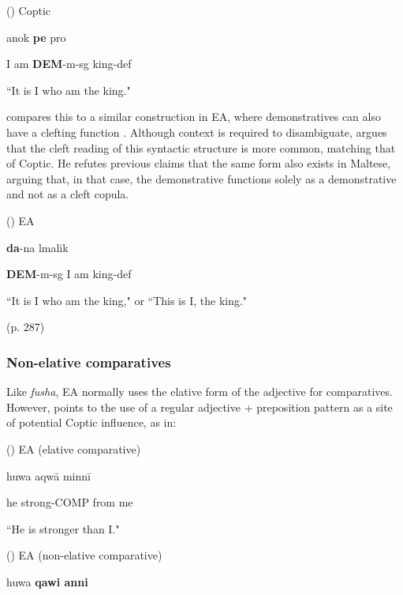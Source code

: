 \documentclass[12pt,a4paper]{article}
\newcounter{example}
\begin{document}
\vspace{3mm}
(\theexample) Coptic

anok \textbf{pe} p\textschwa ro

I am \textbf{DEM}-m-sg king-def

``It is I who am the king."
\begin{flushright}
\parencite[287]{bishai_coptic_1962}
\end{flushright}

\textcite{bishai_coptic_1962} compares this to a similar construction in EA, where demonstratives can also have a clefting function \parencite{gad_syntactic_2011}. Although context is required to disambiguate, \textcite{bishai_coptic_1962} argues that the cleft reading of this syntactic structure is more common, matching that of Coptic. He refutes previous claims that the same form also exists in Maltese, arguing that, in that case, the demonstrative functions solely as a demonstrative and not as a cleft copula.

\vspace{3mm}
(\theexample) EA

\textbf{da}-na lmalik

\textbf{DEM}-m-sg I am king-def

``It is I who am the king," or ``This is I, the king."
\begin{flushright}
(p. 287)
\end{flushright}

\subsubsection{Non-elative comparatives}

Like \textit{fusha}, EA normally uses the elative form of the adjective for comparatives. However, \textcite{bishai_coptic_1962} points to the use of a regular adjective + preposition pattern as a site of potential Coptic influence, as in:

\vspace{3mm}
(\theexample) EA (elative comparative)

huwa \textglotstop aqwā minnī

he strong-COMP from me

``He is stronger than I."

\vspace{3mm}
(\theexample) EA (non-elative comparative)

huwa \textbf{qawi \textrevglotstop anni}
\end{document}
